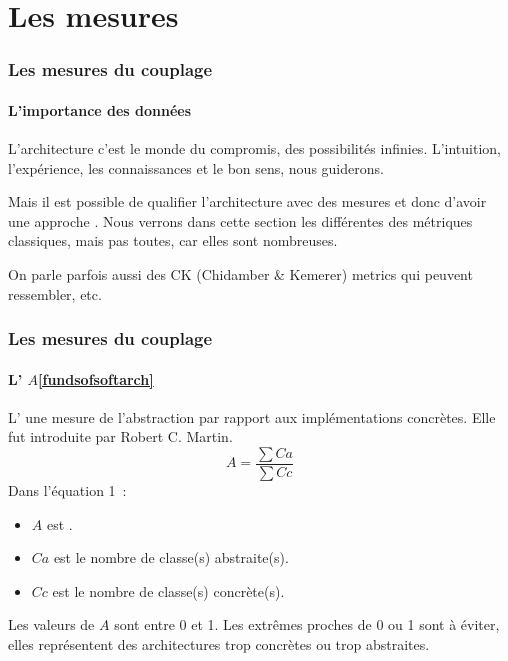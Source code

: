 \documentclass{beamer}
\begin{document}
    \section{Les mesures}\label{sec:les-mesures}

    \begin{frame}
        \transdissolve
        \frametitle{Les mesures du couplage}
        \framesubtitle{L'importance des données}
        L'architecture c'est le monde du compromis, des possibilités infinies.
        \bigbreak
        L'intuition, l'expérience, les connaissances et le bon sens, nous guiderons.

        Mais il est possible de qualifier l'architecture avec des mesures et donc d'avoir une approche  .
        \bigbreak
        Nous verrons dans cette section les différentes des métriques classiques, mais pas toutes, car elles sont nombreuses.

        On parle parfois aussi des CK (Chidamber \& Kemerer) metrics qui peuvent ressembler, etc.
    \end{frame}

    \begin{frame}
        \transdissolve
        \frametitle{Les mesures du couplage}
        \framesubtitle{L' $A$\cref{fundsofsoftarch}}
        L'  une mesure de l'abstraction par rapport aux implémentations concrètes.
        Elle fut introduite par Robert C. Martin.
        \begin{equation}
            A = \frac{\sum Ca}{\sum Cc}
        \end{equation}
        Dans l'équation 1~:
        \begin{itemize}
            \item $A$ est .
            \item $Ca$ est le nombre de classe(s) abstraite(s).
            \item $Cc$ est le nombre de classe(s) concrète(s).
        \end{itemize}
        \bigbreak
        Les valeurs de $A$ sont entre 0 et 1.
        Les extrêmes proches de 0 ou 1 sont à éviter, elles représentent des architectures trop concrètes ou trop abstraites.
    \end{frame}
\end{document}
